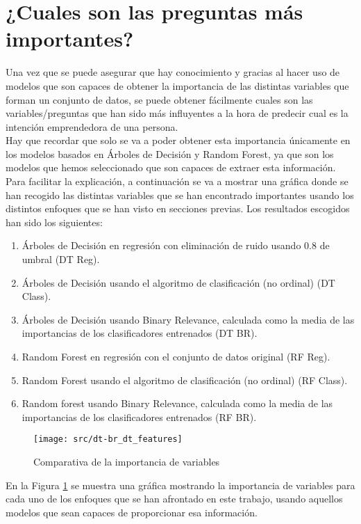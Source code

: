 \section{¿Cuales son las preguntas más importantes?}
Una vez que se puede asegurar que hay conocimiento y gracias al hacer uso de modelos que son capaces de obtener la importancia de las distintas variables que forman un conjunto de datos, se puede obtener fácilmente cuales son las variables/preguntas que han sido más influyentes a la hora de predecir cual es la intención emprendedora de una persona.\\
Hay que recordar que solo se va a poder obtener esta importancia únicamente en los modelos basados en Árboles de Decisión y Random Forest, ya que son los modelos que hemos seleccionado que son capaces de extraer esta información.\\
\linebreak
Para facilitar la explicación, a continuación se va a mostrar una gráfica donde se han recogido las distintas variables que se han encontrado importantes usando los distintos enfoques que se han visto en secciones previas. Los resultados escogidos han sido los siguientes:
\begin{enumerate}
	\item Árboles de Decisión en regresión con eliminación de ruido usando $0.8$ de umbral (DT Reg).
	\item Árboles de Decisión usando el algoritmo de clasificación (no ordinal) (DT Class).
	\item Árboles de Decisión usando Binary Relevance, calculada como la media de las importancias de los clasificadores entrenados (DT BR).
	\item Random Forest en regresión con el conjunto de datos original (RF Reg).
	\item Random Forest usando el algoritmo de clasificación (no ordinal) (RF Class).
	\item Random forest usando Binary Relevance, calculada como la media de las importancias de los clasificadores entrenados (RF BR).
\end{enumerate}
\begin{figure}[H]
	\centering
	\texttt{[image: src/dt-br\_dt\_features]}
	\caption{Comparativa de la importancia de variables}
	\label{fig:dt_ft_cmp1}
\end{figure}
En la Figura \ref{fig:dt_ft_cmp1} se muestra una gráfica mostrando la importancia de variables para cada uno de los enfoques que se han afrontado en este trabajo, usando aquellos modelos que sean capaces de proporcionar esa información.\\
